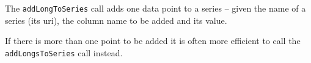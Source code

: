 The \verb+addLongToSeries+ call adds one data point to a series -- given the name of a series (its uri),
the column name to be added and its value.

If there is more than one point to be added it is often more efficient to call the \verb+addLongsToSeries+ call
instead.
